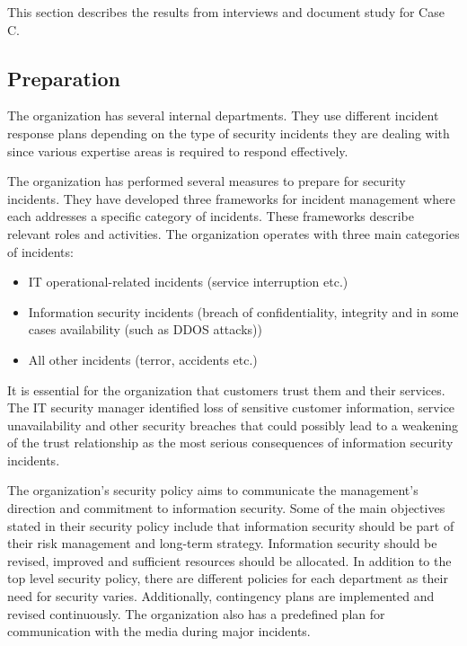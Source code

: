 This section describes the results from interviews and document study for Case C.

\subsection{Preparation}
The organization has several internal departments. They use different incident response plans depending on the type of security incidents they are dealing with since various expertise areas is required to respond effectively. 

The organization has performed several measures to prepare for security incidents. They have developed three frameworks for incident management where each addresses a specific category of incidents. These frameworks describe relevant roles and activities. The organization operates with three main categories of incidents:

\begin{itemize}
\item IT operational-related incidents (service interruption etc.)
\item Information security incidents (breach of confidentiality, integrity and in some cases availability (such as DDOS attacks))
\item All other incidents (terror, accidents etc.)
\end{itemize}
 
It is essential for the organization that customers trust them and their services. The IT security manager identified loss of sensitive customer information, service unavailability and other security breaches that could possibly lead to a weakening of the trust relationship as the most serious consequences of information security incidents. 

The organization's security policy aims to communicate the management's direction and commitment to information security. Some of the main objectives stated in their security policy include that information security should be part of their risk management and long-term strategy. Information security should be revised, improved and sufficient resources should be allocated. In addition to the top level security policy, there are different policies for each department as their need for security varies. Additionally, contingency plans are implemented and revised continuously. The organization also has a predefined plan for communication with the media during major incidents. 

